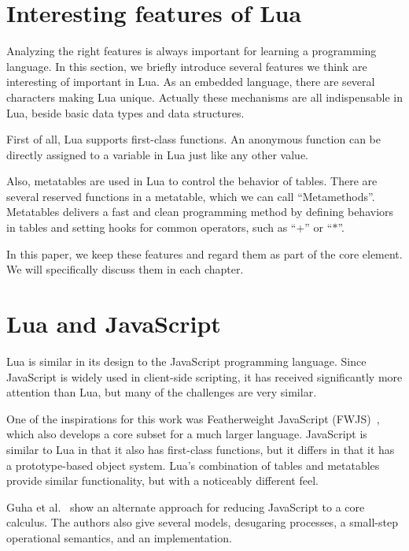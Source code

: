 \section{Interesting features of Lua}
Analyzing the right features is always important for learning a programming language. In this section, we briefly introduce several features we think are interesting of important in Lua.
As an embedded language, there are several characters making Lua unique. 
Actually these mechanisms are all indispensable in Lua, beside basic data types and data structures.

First of all, Lua supports first-class functions. An anonymous function can be directly assigned to a variable in Lua just like any other value.

Also, metatables are used in Lua to control the behavior of tables.
There are several reserved functions in a metatable, which we can call ``Metamethods''.
Metatables delivers a fast and clean programming method by defining behaviors in tables and setting hooks for common operators, such as ``+'' or ``$\ast$''.

In this paper, we keep these features and regard them as part of the core element.
We will specifically discuss them in each chapter.

\section{Lua and JavaScript}
Lua is similar in its design to the JavaScript programming language. Since JavaScript is widely used in client-side scripting, it has received significantly more attention than Lua, but many of the challenges are very similar.

One of the inspirations for this work was Featherweight JavaScript (FWJS)~\cite{FWJS}, which also develops a core subset for a much larger language.
JavaScript is similar to Lua in that it also has first-class functions, but it differs in that it has a prototype-based object system. Lua's combination of tables and metatables provide similar functionality, but with a noticeably different feel.

Guha et al.~\cite{EOJS} show an alternate approach for reducing JavaScript to a core calculus. The authors also give several models, desugaring processes, a small-step operational semantics, and an implementation.

